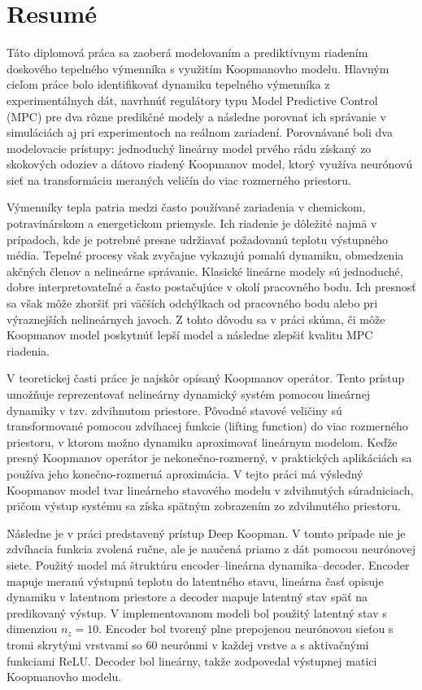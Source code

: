 \chapter{Resumé}

Táto diplomová práca sa zaoberá modelovaním a prediktívnym riadením doskového tepelného výmenníka s využitím Koopmanovho modelu. Hlavným cieľom práce bolo identifikovať dynamiku tepelného výmenníka z experimentálnych dát, navrhnúť regulátory typu Model Predictive Control (MPC) pre dva rôzne predikčné modely a následne porovnať ich správanie v simuláciách aj pri experimentoch na reálnom zariadení. Porovnávané boli dva modelovacie prístupy: jednoduchý lineárny model prvého rádu získaný zo skokových odoziev a dátovo riadený Koopmanov model, ktorý využíva neurónovú sieť na transformáciu meraných veličín do viac rozmerného priestoru.

Výmenníky tepla patria medzi často používané zariadenia v chemickom, potravinárskom a energetickom priemysle. Ich riadenie je dôležité najmä v prípadoch, kde je potrebné presne udržiavať požadovanú teplotu výstupného média. Tepelné procesy však zvyčajne vykazujú pomalú dynamiku, obmedzenia akčných členov a nelineárne správanie. Klasické lineárne modely sú jednoduché, dobre interpretovateľné a často postačujúce v okolí pracovného bodu. Ich presnosť sa však môže zhoršiť pri väčších odchýlkach od pracovného bodu alebo pri výraznejších nelineárnych javoch. Z tohto dôvodu sa v práci skúma, či môže Koopmanov model poskytnúť lepší model a následne zlepšiť kvalitu MPC riadenia.

V teoretickej časti práce je najskôr opísaný Koopmanov operátor. Tento prístup umožňuje reprezentovať nelineárny dynamický systém pomocou lineárnej dynamiky v tzv. zdvihnutom priestore. Pôvodné stavové veličiny sú transformované pomocou zdvíhacej funkcie (lifting function) do viac rozmerného priestoru, v ktorom možno dynamiku aproximovať lineárnym modelom. Keďže presný Koopmanov operátor je nekonečno-rozmerný, v praktických aplikáciách sa používa jeho konečno-rozmerná aproximácia. V tejto práci má výsledný Koopmanov model tvar lineárneho stavového modelu v zdvihnutých súradniciach, pričom výstup systému sa získa spätným zobrazením zo zdvihnutého priestoru.

Následne je v práci predstavený prístup Deep Koopman. V tomto prípade nie je zdvíhacia funkcia zvolená ručne, ale je naučená priamo z dát pomocou neurónovej siete. Použitý model má štruktúru encoder--lineárna dynamika--decoder. Encoder mapuje meranú výstupnú teplotu do latentného stavu, lineárna časť opisuje dynamiku v latentnom priestore a decoder mapuje latentný stav späť na predikovaný výstup. V implementovanom modeli bol použitý latentný stav s dimenziou $n_z = 10$. Encoder bol tvorený plne prepojenou neurónovou sieťou s tromi skrytými vrstvami so 60 neurónmi v každej vrstve a s aktivačnými funkciami ReLU. Decoder bol lineárny, takže zodpovedal výstupnej matici Koopmanovho modelu.


